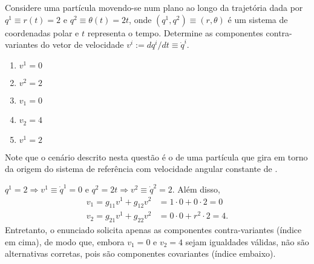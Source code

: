 \begin{question}
    Considere uma partícula movendo-se num plano ao longo da trajetória dada por $q^1 \equiv r(t) = 2$ e $q^2 \equiv \theta(t) = 2t$, onde $(q^1, q^2) \equiv (r,\theta)$ é um sistema de coordenadas polar e $t$ representa o tempo.
    Determine as componentes contra-variantes do vetor de velocidade $v^i := dq^i/dt \equiv \dot q^i$.
    \begin{enumerate}
      \item $v^1 = 0$ \rightanswer
      \item $v^2 = 2$ \rightanswer
      \item $v_1 = 0$
      \item $v_2 = 4$
      \item $v^1 = 2$
    \end{enumerate}

    Note que o cenário descrito nesta questão é o de uma partícula que gira em torno da origem do sistema de referência com velocidade angular constante de .

    \begin{solution}
      $q^1 = 2 \Rightarrow v^1 \equiv \dot q^1 = 0$ e $q^2 = 2t \Rightarrow v^2 \equiv \dot q^2 = 2$.
      Além disso,
      \begin{align*}
        v_1 = g_{11} v^1 + g_{12} v^2 &= 1 \cdot 0 + 0 \cdot 2 = 0 \\
        v_2 = g_{21} v^1 + g_{22} v^2 &= 0 \cdot 0 + r^2 \cdot 2  = 4.
      \end{align*}
      Entretanto, o enunciado solicita apenas as componentes contra-variantes (índice em cima), de modo que, embora $v_1 = 0$ e $v_2 = 4$ sejam igualdades válidas, não são alternativas corretas, pois são componentes covariantes (índice embaixo).
    \end{solution}
\end{question}